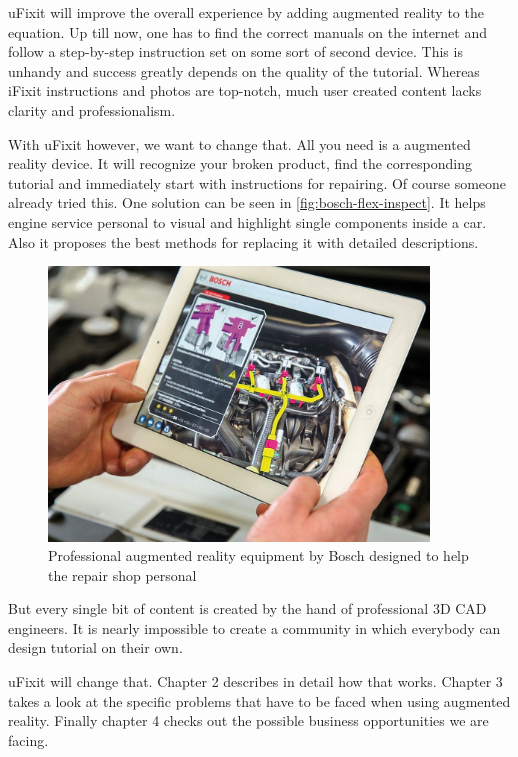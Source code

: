 	uFixit will improve the overall experience by adding augmented reality to the equation. Up till now, one has to find the correct manuals on the internet and follow a step-by-step instruction set on some sort of second device. This is unhandy and success greatly depends on the quality of the tutorial. Whereas iFixit instructions and photos are top-notch, much user created content lacks clarity and professionalism.
	
	With uFixit however, we want to change that. All you need is a augmented reality device. It will recognize your broken product, find the corresponding tutorial and immediately start with instructions for repairing. Of course someone already tried this. One solution can be seen in \autoref{fig:bosch-flex-inspect}. It helps engine service personal to visual and highlight single components inside a car. Also it proposes the best methods for replacing it with detailed descriptions.
	
	\begin{figure}[H]
		\includegraphics[width=0.9\textwidth]{../images/bosch-flex-inspect.jpg}
		\centering
		\caption[Professional augmented reality equipment by Bosch designed to help the repair shop personal]{Professional augmented reality equipment by Bosch designed to help the repair shop personal\footnotemark}
		\label{fig:bosch-flex-inspect}
	\end{figure}
	
	But every single bit of content is created by the hand of professional 3D CAD engineers. It is nearly impossible to create a community in which everybody can design tutorial on their own.
	
	uFixit will change that. Chapter 2 describes in detail how that works. Chapter 3 takes a look at the specific problems that have to be faced when using augmented reality. Finally chapter 4 checks out the possible business opportunities we are facing.

